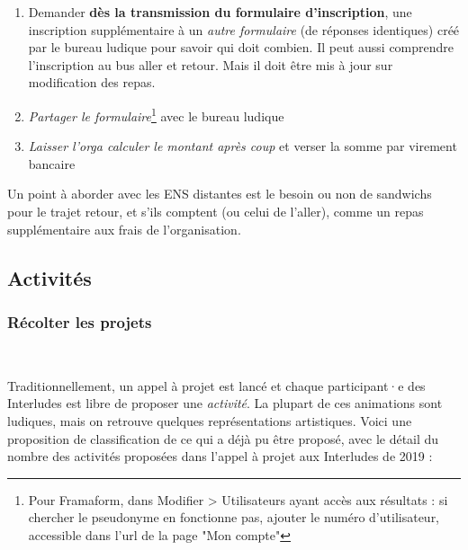 \begin{enumerate}
    \item Demander \textbf{dès la transmission du formulaire d'inscription}, une inscription supplémentaire à un \emph{autre formulaire} (de réponses identiques) créé par le bureau ludique pour savoir qui doit combien. Il peut aussi comprendre l'inscription au bus aller et retour. Mais il doit être mis à jour sur modification des repas.
    \item \emph{Partager le formulaire}\footnote{Pour Framaform, dans Modifier > Utilisateurs ayant accès aux résultats : si chercher le pseudonyme en fonctionne pas, ajouter le numéro d'utilisateur, accessible dans l'url de la page "Mon compte"} avec le bureau ludique
    \item \emph{Laisser l'orga calculer le montant après coup} et verser la somme par virement bancaire
\end{enumerate}

Un point à aborder avec les ENS distantes est le besoin ou non de sandwichs pour le trajet retour, et s'ils comptent (ou celui de l'aller), comme un repas supplémentaire aux frais de l'organisation.

\subsection{Activités}\label{sec:activités}

\subsubsection{Récolter les projets}~

Traditionnellement, un appel à projet est lancé et chaque participant·e des Interludes est libre de proposer une \emph{activité}. La plupart de ces animations sont ludiques, mais on retrouve quelques représentations artistiques. Voici une proposition de classification de ce qui a déjà pu être proposé, avec le détail du nombre des activités proposées dans l'appel à projet aux Interludes de 2019 :

